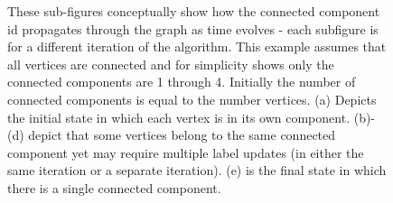 \begin{figure}[t]
\centering

  \caption{These sub-figures conceptually show how the connected component id propagates through the graph as time evolves - each subfigure is for a different iteration of the algorithm. This example assumes that all vertices are connected and for simplicity shows only the connected components are 1 through 4. Initially the number of connected components is equal to the number vertices. (a) Depicts the initial state in which each vertex is in its own component. (b)-(d) depict that some vertices belong to the same connected component yet may require multiple label updates (in either the same iteration or a separate iteration).
	(e) is the final state in which there is a single connected component.}
  \label{fig:svPropagation}
\end{figure}